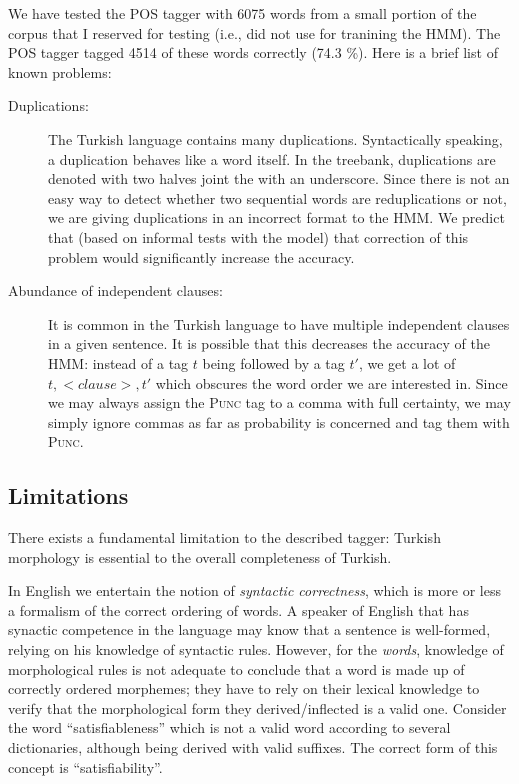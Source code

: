 \documentclass{article}
\begin{document}
We have tested the POS tagger with 6075 words from a small portion of the corpus
that I reserved for testing (i.e., did not use for tranining the HMM). The POS
tagger tagged 4514 of these words correctly (74.3 \%). Here is a brief list of
known problems:

\begin{description}

  \item[Duplications:] The Turkish language contains many duplications.
  Syntactically speaking, a duplication behaves like a word itself. In the
  treebank, duplications are denoted with two halves joint the with an
  underscore. Since there is not an easy way to detect whether two sequential
  words are reduplications or not, we are giving duplications in an incorrect
  format to the HMM.  We predict that (based on informal tests with the model)
  that correction of this problem would significantly increase the accuracy.

  \item[Abundance of independent clauses:] It is common in the Turkish language
  to have multiple independent clauses in a given sentence. It is possible that
  this decreases the accuracy of the HMM: instead of a tag $t$ being followed by
  a tag $t'$, we get a lot of $t, <clause>, t'$ which obscures the word order we
  are interested in. Since we may always assign the \textsc{Punc} tag to a comma
  with full certainty, we may simply ignore commas as far as probability is
  concerned and tag them with \textsc{Punc}.

\end{description}

\subsection{Limitations}
There exists a fundamental limitation to the described tagger: Turkish
morphology is essential to the overall completeness of Turkish.

In English we entertain the notion of \emph{syntactic correctness}, which is
more or less a formalism of the correct ordering of words. A speaker of English
that has synactic competence in the language \citep{bachman1990} may know that a
sentence is well-formed, relying on his knowledge of syntactic rules. However,
for the \textit{words}, knowledge of morphological rules is not adequate to
conclude that a word is made up of correctly ordered morphemes; they have to
rely on their lexical knowledge to verify that the morphological form they
derived/inflected is a valid one. Consider the word ``satisfiableness'' which is
not a valid word according to several dictionaries, although being derived with
valid suffixes. The correct form of this concept is ``satisfiability''.
\end{document}
